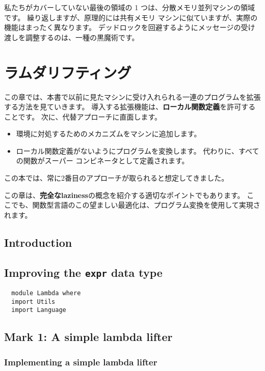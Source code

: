 \documentclass{jarticle}
\begin{document}
私たちがカバーしていない最後の領域の 1 つは、分散メモリ並列マシンの領域です。
繰り返しますが、原理的には共有メモリ マシンに似ていますが、実際の機能はまったく異なります。
デッドロックを回避するようにメッセージの受け渡しを調整するのは、一種の黒魔術です。
\newpage

\section{ラムダリフティング}

この章では、本書で以前に見たマシンに受け入れられる一連のプログラムを拡張する方法を見ていきます。
導入する拡張機能は、\textbf{ローカル関数定義}を許可することです。
次に、代替アプローチに直面します。

\begin{itemize}
	\item 環境に対処するためのメカニズムをマシンに追加します。
	\item ローカル関数定義がないようにプログラムを変換します。
	      代わりに、すべての関数がスーパー コンビネータとして定義されます。
\end{itemize}

この本では、常に2番目のアプローチが取られると想定してきました。

この章は、\textbf{完全なlaziness}の概念を紹介する適切なポイントでもあります。
ここでも、関数型言語のこの望ましい最適化は、プログラム変換を使用して実現されます。

\subsection{Introduction}
\newpage

\subsection{Improving the \texttt{expr} data type}

\begin{verbatim}
  module Lambda where
  import Utils
  import Language
\end{verbatim}
\newpage

\subsection{Mark 1: A simple lambda lifter}
\subsubsection{Implementing a simple lambda lifter}
\end{document}
